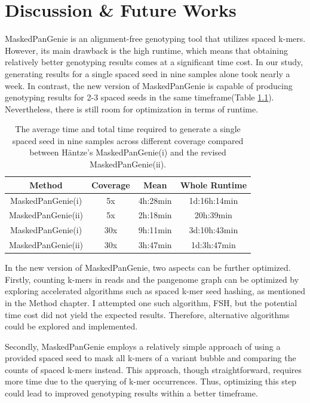 \documentclass{PHlab-thesis}
\begin{document}
\chapter{Discussion \& Future Works}
MaskedPanGenie is an alignment-free genotyping tool that utilizes spaced k-mers. However, its main drawback is the high runtime, which means that obtaining relatively better genotyping results comes at a significant time cost. In our study, generating results for a single spaced seed in nine samples alone took nearly a week. In contrast, the new version of MaskedPanGenie is capable of producing genotyping results for 2-3 spaced seeds in the same timeframe(Table \ref{table:RuntimeSpaced}). Nevertheless, there is still room for optimization in terms of runtime.

\begin{table}[h!]
	\centering
	\begin{tabular*}{\textwidth}{@{\extracolsep{\fill}}cccc@{\extracolsep{\fill}}}
        \toprule
        Method & Coverage & Mean & Whole Runtime\\
        \midrule
        MaskedPanGenie(i)& 5x & 4h:28min & 1d:16h:14min\\
        MaskedPanGenie(ii)& 5x & 2h:18min & 20h:39min\\
        \midrule
        MaskedPanGenie(i)& 30x & 9h:11min & 3d:10h:43min\\
        MaskedPanGenie(ii)& 30x & 3h:47min & 1d:3h:47min\\
        \bottomrule 
	\end{tabular*}
	\caption{The average time and total time required to generate a single spaced seed in nine samples across different coverage compared between Häntze's MaskedPanGenie(i) and the revised MaskedPanGenie(ii).}
	\label{table:RuntimeSpaced}
\end{table}

In the new version of MaskedPanGenie, two aspects can be further optimized. Firstly, counting k-mers in reads and the pangenome graph can be optimized by exploring accelerated algorithms such as spaced k-mer seed hashing, as mentioned in the Method chapter. I attempted one such algorithm, FSH, but the potential time cost did not yield the expected results. Therefore, alternative algorithms could be explored and implemented.

Secondly, MaskedPanGenie employs a relatively simple approach of using a provided spaced seed to mask all k-mers of a variant bubble and comparing the counts of spaced k-mers instead. This approach, though straightforward, requires more time due to the querying of k-mer occurrences. Thus, optimizing this step could lead to improved genotyping results within a better timeframe.
\end{document}

